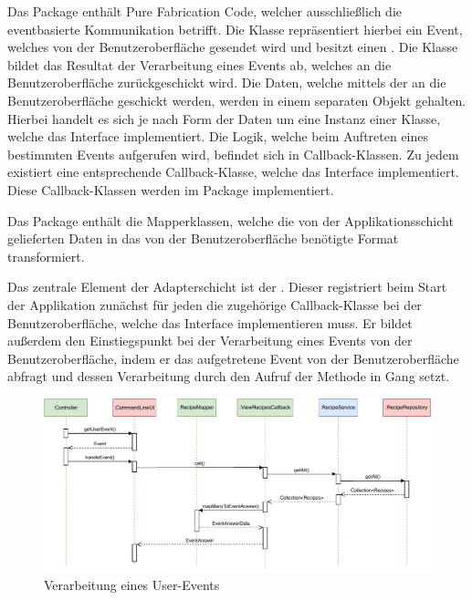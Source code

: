 Das Package \href{https://github.com/anditru/quickie/tree/bb41442c7f1ffbfcd3117cd86a40f7932e543a33/1-quickie-adapters/src/main/java/org/pinkcrazyunicorn/quickie/adapters/event}{} enthält Pure Fabrication Code, welcher ausschließlich die eventbasierte Kommunikation betrifft. Die Klasse  repräsentiert hierbei ein Event, welches von der Benutzeroberfläche gesendet wird und besitzt einen . Die Klasse  bildet das Resultat der Verarbeitung eines Events ab, welches an die Benutzeroberfläche zurückgeschickt wird. Die Daten, welche mittels der  an die Benutzeroberfläche geschickt werden, werden in einem separaten Objekt gehalten. Hierbei handelt es sich je nach Form der Daten um eine Instanz einer Klasse, welche das Interface  implementiert. Die Logik, welche beim Auftreten eines bestimmten Events aufgerufen wird, befindet sich in Callback-Klassen. Zu jedem  existiert eine entsprechende Callback-Klasse, welche das Interface  implementiert. Diese Callback-Klassen werden im Package \href{https://github.com/anditru/quickie/tree/bb41442c7f1ffbfcd3117cd86a40f7932e543a33/1-quickie-adapters/src/main/java/org/pinkcrazyunicorn/quickie/adapters/callbacks}{} implementiert.

Das Package \href{https://github.com/anditru/quickie/tree/bb41442c7f1ffbfcd3117cd86a40f7932e543a33/1-quickie-adapters/src/main/java/org/pinkcrazyunicorn/quickie/adapters/mappers}{} enthält die Mapperklassen, welche die von der Applikationsschicht gelieferten Daten in das von der Benutzeroberfläche benötigte Format transformiert.

Das zentrale Element der Adapterschicht ist der \href{https://github.com/anditru/quickie/blob/bb41442c7f1ffbfcd3117cd86a40f7932e543a33/1-quickie-adapters/src/main/java/org/pinkcrazyunicorn/quickie/adapters/Controller.java}{}. Dieser registriert beim Start der Applikation zunächst für jeden  die zugehörige Callback-Klasse bei der Benutzeroberfläche, welche das Interface  implementieren muss. Er bildet außerdem den Einstiegspunkt bei der Verarbeitung eines Events von der Benutzeroberfläche, indem er das aufgetretene Event von der Benutzeroberfläche abfragt und dessen Verarbeitung durch den Aufruf der Methode  in Gang setzt.

\begin{figure}[ht!]
    \includegraphics[width=0.98\columnwidth]{../diagrams/adapter_sequence.pdf}
    \caption{Verarbeitung eines User-Events}
    \label{fig:squence-diag-adapter}
\end{figure}

